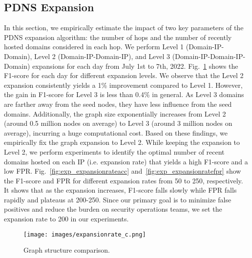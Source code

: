 \subsection{PDNS Expansion}
\label{subsec:pdnsexpansion}




In this section, we empirically estimate the impact of two key parameters of the PDNS expansion algorithm: the number of hops and the number of recently hosted domains considered in each hop. 
We perform Level 1 (Domain-IP-Domain), Level 2 (Domain-IP-Domain-IP), and Level 3 (Domain-IP-Domain-IP-Domain) expansions for each day from July 1st to 7th, 2022. Fig.~\ref{fig:expansion_types} shows the F1-score for each day for different expansion levels. We observe that the Level 2 expansion consistently yields a 1\% improvement compared to Level 1. However, the gain in F1-score for Level 3 is less than 0.4\% in general. As Level 3 domains are farther away from the seed nodes, they have less influence from the seed domains. Additionally, the graph size exponentially increases from Level 2 (around 0.5 million nodes on average) to Level 3 (around 3 million nodes on average), incurring a huge computational cost. Based on these findings, we empirically fix the graph expansion to Level 2.
While keeping the expansion to Level 2, we perform experiments to identify the optimal number of recent domains hosted on each IP (i.e. expansion rate) that yields a high F1-score and a low FPR. Fig.~\ref{fig:exp_expansionrateacc} and~\ref{fig:exp_expansionratefpr} show the F1-score and FPR for different expansion rates from 50 to 250, respectively. It shows that as the expansion increases, F1-score falls slowly while FPR falls rapidly and plateaus at 200-250. Since our primary goal is to minimize false positives and reduce the burden on security operations teams, we set the expansion rate to 200 in our experiments. 
\begin{figure}
\centering
\texttt{[image: images/expansionrate\_c.png]}
\caption{Graph structure comparison.  }
\label{fig:expansion_types}
\end{figure}



